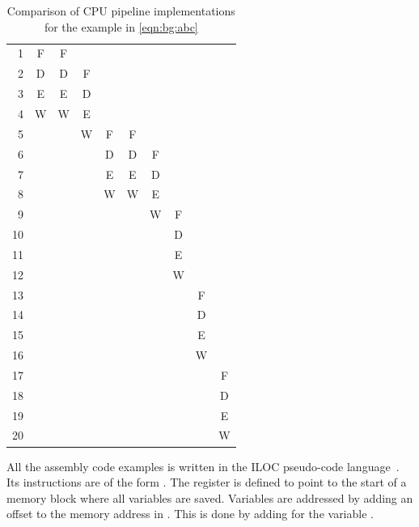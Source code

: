 \begin{table}
{{\begin{tabular}{rccccccccc}
                \midrule
                 1 & F & F &   &   &   &   &   &   &   \\ \rowcolor[gray]{.975}
                 2 & D & D & F &   &   &   &   &   &   \\
                 3 & E & E & D &   &   &   &   &   &   \\ \rowcolor[gray]{.975}
                 4 & W & W & E &   &   &   &   &   &   \\
                 5 &   &   & W & F & F &   &   &   &   \\ \rowcolor[gray]{.975}
                 6 &   &   &   & D & D & F &   &   &   \\
                 7 &   &   &   & E & E & D &   &   &   \\ \rowcolor[gray]{.975}
                 8 &   &   &   & W & W & E &   &   &   \\
                 9 &   &   &   &   &   & W & F &   &   \\ \rowcolor[gray]{.975}
                10 &   &   &   &   &   &   & D &   &   \\
                11 &   &   &   &   &   &   & E &   &   \\ \rowcolor[gray]{.975}
                12 &   &   &   &   &   &   & W &   &   \\
                13 &   &   &   &   &   &   &   & F &   \\ \rowcolor[gray]{.975}
                14 &   &   &   &   &   &   &   & D &   \\
                15 &   &   &   &   &   &   &   & E &   \\ \rowcolor[gray]{.975}
                16 &   &   &   &   &   &   &   & W &   \\
                17 &   &   &   &   &   &   &   &   & F \\ \rowcolor[gray]{.975}
                18 &   &   &   &   &   &   &   &   & D \\
                19 &   &   &   &   &   &   &   &   & E \\ \rowcolor[gray]{.975}
                20 &   &   &   &   &   &   &   &   & W \\ 
                \bottomrule
            \end{tabular}
        }
    }
    \caption[Comparison of CPU pipeline implementations]{Comparison of CPU pipeline implementations for the example in \cref{eqn:bg:abc}}
    \label{tbl:bg:pipeline}
\end{table}

All the assembly code examples is written in the ILOC pseudo-code language~\cite{engineeringcompiler2007}.
Its instructions are of the form .
The register  is defined to point to the start of a memory block where all variables are saved.
Variables are addressed by adding an offset to the memory address in .
This is done by adding \eg {} for the variable .

